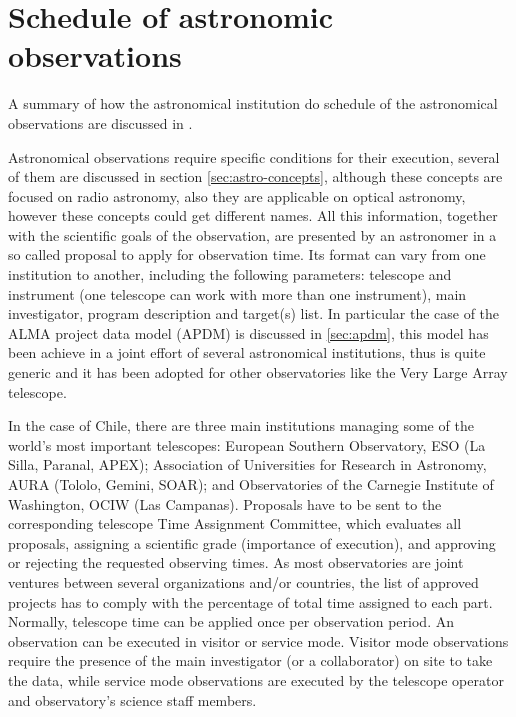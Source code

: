 \section{Schedule of astronomic observations}

A summary of how the astronomical institution do schedule of the astronomical observations are discussed in \cite{mora11}.

Astronomical observations require specific conditions for their execution, several of them are discussed in section \ref{sec:astro-concepts}, although these concepts are focused on radio astronomy, also they are applicable on optical astronomy, however these concepts could get different names. All this information, together with the scientific goals of the observation, are presented by an astronomer in a so called proposal to apply for observation time. Its format can vary from one institution to another, including the following parameters: telescope and instrument (one telescope can work with more than one instrument), main investigator, program description and target(s) list. In particular the case of the ALMA project data model (APDM) is discussed in \ref{sec:apdm}, this model has been achieve in a joint effort of several astronomical institutions, thus is quite generic and it has been adopted for other observatories like the Very Large Array telescope.

In the case of Chile, there are three main institutions managing some of the world’s most important telescopes: European Southern Observatory, ESO (La Silla, Paranal, APEX); Association of Universities for Research in Astronomy, AURA (Tololo, Gemini, SOAR); and Observatories of the Carnegie Institute of Washington, OCIW (Las Campanas). Proposals have to be sent to the corresponding telescope Time Assignment Committee, which evaluates all proposals, assigning a scientific grade (importance of execution), and approving or rejecting the requested observing times. As most observatories are joint ventures between several organizations and/or countries, the list of approved projects has to comply with the percentage of total time assigned to each part. Normally, telescope time can be applied once per observation period. An observation can be executed in visitor or service mode. Visitor mode observations require the presence of the main investigator (or a collaborator) on site to take the data, while service mode observations are executed by the telescope operator and observatory’s science staff members.

